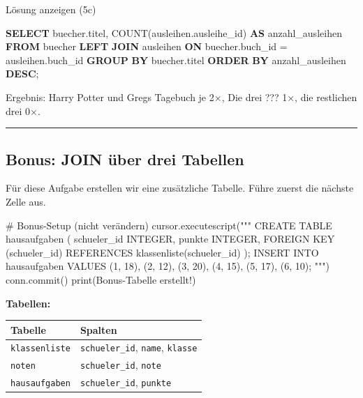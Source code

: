 \documentclass[
  nswissgerman,
  a4paper,
  DIV=11,
  numbers=noendperiod,
  ngerman]{scrreprt}
\newenvironment{Shaded}{\begin{snugshade}}{\end{snugshade}}
\newcommand{\BuiltInTok}[1]{\textcolor[rgb]{0.00,0.23,0.31}{#1}}
\newcommand{\CommentTok}[1]{\textcolor[rgb]{0.37,0.37,0.37}{#1}}
\newcommand{\FunctionTok}[1]{\textcolor[rgb]{0.28,0.35,0.67}{#1}}
\newcommand{\KeywordTok}[1]{\textcolor[rgb]{0.00,0.23,0.31}{\textbf{#1}}}
\newcommand{\NormalTok}[1]{\textcolor[rgb]{0.00,0.23,0.31}{#1}}
\newcommand{\OperatorTok}[1]{\textcolor[rgb]{0.37,0.37,0.37}{#1}}
\newcommand{\StringTok}[1]{\textcolor[rgb]{0.13,0.47,0.30}{#1}}
\newcounter{none} %
\begin{document}
Lösung anzeigen (5c)

\begin{Shaded}
\begin{Highlighting}[numbers=left,,]
\KeywordTok{SELECT}\NormalTok{ buecher.titel,}
       \FunctionTok{COUNT}\NormalTok{(ausleihen.ausleihe\_id) }\KeywordTok{AS}\NormalTok{ anzahl\_ausleihen}
\KeywordTok{FROM}\NormalTok{ buecher}
\KeywordTok{LEFT} \KeywordTok{JOIN}\NormalTok{ ausleihen}
  \KeywordTok{ON}\NormalTok{ buecher.buch\_id }\OperatorTok{=}\NormalTok{ ausleihen.buch\_id}
\KeywordTok{GROUP} \KeywordTok{BY}\NormalTok{ buecher.titel}
\KeywordTok{ORDER} \KeywordTok{BY}\NormalTok{ anzahl\_ausleihen }\KeywordTok{DESC}\NormalTok{;}
\end{Highlighting}
\end{Shaded}

Ergebnis: Harry Potter und Gregs Tagebuch je 2×, Die drei ??? 1×, die
restlichen drei 0×.

\begin{center}\rule{0.5\linewidth}{0.5pt}\end{center}

\subsection{Bonus: JOIN über drei
Tabellen}\label{bonus-join-uxfcber-drei-tabellen}

Für diese Aufgabe erstellen wir eine zusätzliche Tabelle. Führe zuerst
die nächste Zelle aus.

\begin{Shaded}
\begin{Highlighting}[numbers=left,,]
\CommentTok{\# Bonus{-}Setup (nicht verändern)}
\NormalTok{cursor.executescript(}\StringTok{"""}
\StringTok{CREATE TABLE hausaufgaben (}
\StringTok{    schueler\_id INTEGER,}
\StringTok{    punkte      INTEGER,}
\StringTok{    FOREIGN KEY (schueler\_id) REFERENCES klassenliste(schueler\_id)}
\StringTok{);}
\StringTok{INSERT INTO hausaufgaben VALUES}
\StringTok{    (1, 18),}
\StringTok{    (2, 12),}
\StringTok{    (3, 20),}
\StringTok{    (4, 15),}
\StringTok{    (5, 17),}
\StringTok{    (6, 10);}
\StringTok{"""}\NormalTok{)}
\NormalTok{conn.commit()}
\BuiltInTok{print}\NormalTok{(}\StringTok{\textquotesingle{}Bonus{-}Tabelle erstellt!\textquotesingle{}}\NormalTok{)}
\end{Highlighting}
\end{Shaded}

\textbf{Tabellen:}

{\def\LTcaptype{none} %
\begin{longtable}[]{@{}ll@{}}
\toprule\noalign{}
Tabelle & Spalten \\
\midrule\noalign{}
\endhead
\bottomrule\noalign{}
\endlastfoot
\texttt{klassenliste} & \texttt{schueler\_id}, \texttt{name},
\texttt{klasse} \\
\texttt{noten} & \texttt{schueler\_id}, \texttt{note} \\
\texttt{hausaufgaben} & \texttt{schueler\_id}, \texttt{punkte} \\
\end{longtable}
}
\end{document}
